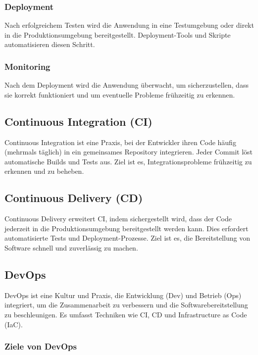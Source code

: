 \subsubsection{Deployment}
Nach erfolgreichem Testen wird die Anwendung in eine Testumgebung oder direkt in die Produktionsumgebung bereitgestellt. Deployment-Tools und Skripte automatisieren diesen Schritt.

\subsubsection{Monitoring}
Nach dem Deployment wird die Anwendung überwacht, um sicherzustellen, dass sie korrekt funktioniert und um eventuelle Probleme frühzeitig zu erkennen.

\subsection{Continuous Integration (CI)}

Continuous Integration ist eine Praxis, bei der Entwickler ihren Code häufig (mehrmals täglich) in ein gemeinsames Repository integrieren. Jeder Commit löst automatische Builds und Tests aus. Ziel ist es, Integrationsprobleme frühzeitig zu erkennen und zu beheben.

\subsection{Continuous Delivery (CD)}

Continuous Delivery erweitert CI, indem sichergestellt wird, dass der Code jederzeit in die Produktionsumgebung bereitgestellt werden kann. Dies erfordert automatisierte Tests und Deployment-Prozesse. Ziel ist es, die Bereitstellung von Software schnell und zuverlässig zu machen.

\subsection{DevOps}

DevOps ist eine Kultur und Praxis, die Entwicklung (Dev) und Betrieb (Ops) integriert, um die Zusammenarbeit zu verbessern und die Softwarebereitstellung zu beschleunigen. Es umfasst Techniken wie CI, CD und Infrastructure as Code (IaC).

\subsubsection{Ziele von DevOps}

